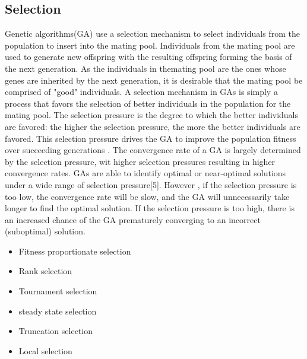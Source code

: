 \documentclass[a4paper, 12pt]{article}
\begin{document}
\subsection{Selection}
Genetic algorithms(GA) use a selection mechanism to select individuals from the population to insert into the mating pool. Individuals from the mating pool are used to generate new offspring with the resulting offspring forming the basis of the next generation. As the individuals in themating pool are the ones whose genes are inherited by the next generation, it is desirable that the mating pool be comprised of "good" individuals. A selection mechanism in GAs is simply a process that favors the selection of better individuals in the population for the mating pool. 
The selection pressure is the degree to which the better individuals are favored: the higher the selection pressure, the more the better
individuals are favored. This selection pressure drives the GA to improve the population fitness over succeeding generations . The convergence
rate of a GA is largely determined by the selection pressure, wit higher selection pressures resulting in higher convergence rates. GAs are 
able to identify optimal or near-optimal solutions under a wide range of selection pressure[5]. However , if the selection pressure is too low, the convergence rate will be slow, and the GA will unnecessarily take longer to find the optimal solution. If the selection pressure is too 
high, there is an increased chance of the GA prematurely converging to an incorrect (suboptimal) solution.
\begin{itemize}
\item Fitness proportionate selection
\item Rank selection
\item Tournament selection
\item steady state selection
\item Truncation selection
\item Local selection
\end{itemize}
\end{document}
